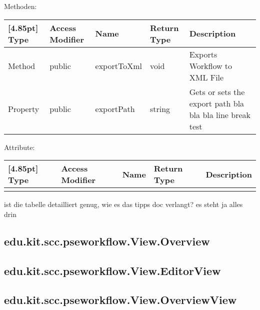             Methoden:
            \begin{center}
	            \setlength\tabcolsep{5pt}
	            \renewcommand{\arraystretch}{1.5}
	            
                \begin{tabularx}{\textwidth}{|l|l|l|l|X|}
                    \hline
                    \rowcolor[gray]{0.75}[4.85pt]
                    Type & Access Modifier & Name & Return Type & Description \\ \hline 
                    Method & public & exportToXml & void & Exports Workflow to XML File \\ \hline
                    Property & public & exportPath & string & Gets or sets the export path bla bla bla line break test\\
                    \hline
                \end{tabularx}
            \end{center}
                
            Attribute:
            \begin{center}
            	\renewcommand{\arraystretch}{1.5}
	            \setlength\tabcolsep{5pt}
            	\begin{tabularx}{\textwidth}{|l|l|l|l|X|}
            		\hline
                    \rowcolor[gray]{0.75}[4.85pt]            		
            		Type & Access Modifier & Name & Return Type & Description \\ \hline 
            		&&&&\\
            		\hline
            	\end{tabularx}
            \end{center}
            ist die tabelle detailliert genug, wie es das tipps doc verlangt? es steht ja alles drin
        
        
        \subsection{edu.kit.scc.pseworkflow.View.Overview}
        \subsection{edu.kit.scc.pseworkflow.View.EditorView}
        \subsection{edu.kit.scc.pseworkflow.View.OverviewView}
                    

